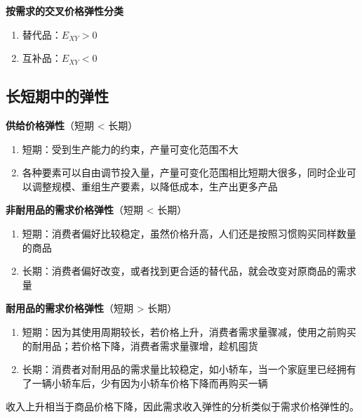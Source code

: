 \noindent\textbf{按需求的交叉价格弹性分类}
\begin{enumerate}
    \item 替代品：$E_{XY}>0$
    \item 互补品：$E_{XY}<0$
\end{enumerate}

\subsection{长短期中的弹性}

\noindent\textbf{供给价格弹性}（短期 < 长期）
\begin{enumerate}
    \item 短期：受到生产能力的约束，产量可变化范围不大
    \item 各种要素可以自由调节投入量，产量可变化范围相比短期大很多，同时企业可以调整规模、重组生产要素，以降低成本，生产出更多产品
\end{enumerate}
\vspace{1em}

\noindent\textbf{非耐用品的需求价格弹性}（短期 < 长期）
\begin{enumerate}
    \item 短期：消费者偏好比较稳定，虽然价格升高，人们还是按照习惯购买同样数量的商品
    \item 长期：消费者偏好改变，或者找到更合适的替代品，就会改变对原商品的需求量
\end{enumerate}
\vspace{1em}

\noindent\textbf{耐用品的需求价格弹性}（短期 > 长期）
\begin{enumerate}
    \item 短期：因为其使用周期较长，若价格上升，消费者需求量骤减，使用之前购买的耐用品；若价格下降，消费者需求量骤增，趁机囤货
    \item 长期：消费者对耐用品的需求量比较稳定，如小轿车，当一个家庭里已经拥有了一辆小轿车后，少有因为小轿车价格下降而再购买一辆
\end{enumerate}
\vspace{1em}

\zhu 收入上升相当于商品价格下降，因此需求收入弹性的分析类似于需求价格弹性的。